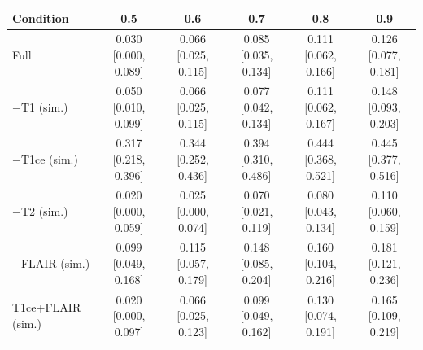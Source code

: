 \begin{tabular}{lccccc}
\toprule
Condition & 0.5 & 0.6 & 0.7 & 0.8 & 0.9 \\
\midrule
Full & 0.030 [0.000, 0.089] & 0.066 [0.025, 0.115] & 0.085 [0.035, 0.134] & 0.111 [0.062, 0.166] & 0.126 [0.077, 0.181] \\
$-$T1 (sim.) & 0.050 [0.010, 0.099] & 0.066 [0.025, 0.115] & 0.077 [0.042, 0.134] & 0.111 [0.062, 0.167] & 0.148 [0.093, 0.203] \\
$-$T1ce (sim.) & 0.317 [0.218, 0.396] & 0.344 [0.252, 0.436] & 0.394 [0.310, 0.486] & 0.444 [0.368, 0.521] & 0.445 [0.377, 0.516] \\
$-$T2 (sim.) & 0.020 [0.000, 0.059] & 0.025 [0.000, 0.074] & 0.070 [0.021, 0.119] & 0.080 [0.043, 0.134] & 0.110 [0.060, 0.159] \\
$-$FLAIR (sim.) & 0.099 [0.049, 0.168] & 0.115 [0.057, 0.179] & 0.148 [0.085, 0.204] & 0.160 [0.104, 0.216] & 0.181 [0.121, 0.236] \\
T1ce+FLAIR (sim.) & 0.020 [0.000, 0.097] & 0.066 [0.025, 0.123] & 0.099 [0.049, 0.162] & 0.130 [0.074, 0.191] & 0.165 [0.109, 0.219] \\
\bottomrule
\end{tabular}
